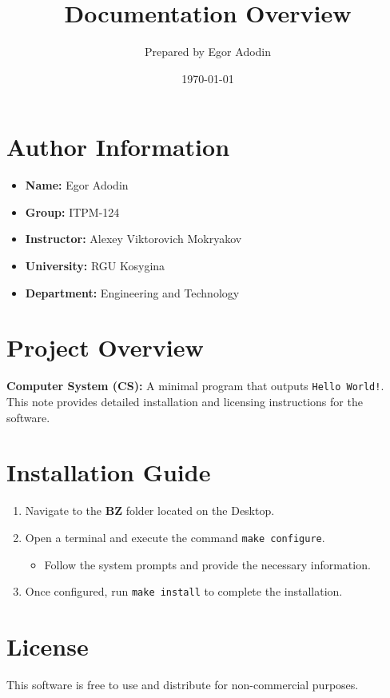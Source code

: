 \documentclass[12pt]{article}
\title{\textbf{Documentation Overview}}
\author{Prepared by Egor Adodin}
\date{\today}
\begin{document}
\maketitle

\section*{Author Information}
\begin{itemize}
    \item \textbf{Name:} Egor Adodin
    \item \textbf{Group:} ITPM-124
    \item \textbf{Instructor:} Alexey Viktorovich Mokryakov
    \item \textbf{University:} RGU Kosygina
    \item \textbf{Department:} Engineering and Technology
\end{itemize}

\section*{Project Overview}
\textbf{Computer System (CS):} A minimal program that outputs \texttt{Hello World!}. This note provides detailed installation and licensing instructions for the software.

\section*{Installation Guide}
\begin{enumerate}
    \item Navigate to the \textbf{BZ} folder located on the Desktop.
    \item Open a terminal and execute the command \texttt{make configure}.
    \begin{itemize}
        \item Follow the system prompts and provide the necessary information.
    \end{itemize}
    \item Once configured, run \texttt{make install} to complete the installation.
\end{enumerate}

\section*{License}
This software is free to use and distribute for non-commercial purposes.
\end{document}
